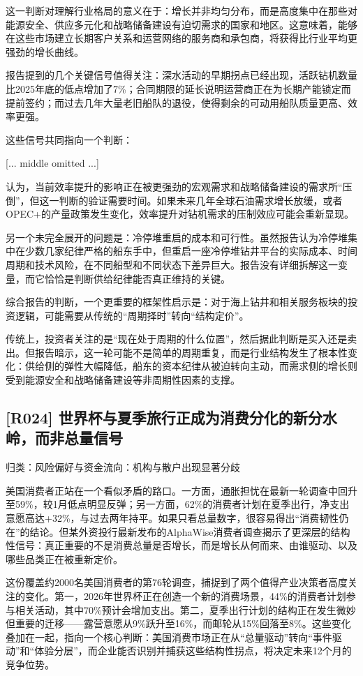 \documentclass[11pt]{ctexart}
\begin{document}
这一判断对理解行业格局的意义在于：增长并非均匀分布，而是高度集中在那些对能源安全、供应多元化和战略储备建设有迫切需求的国家和地区。这意味着，能够在这些市场建立长期客户关系和运营网络的服务商和承包商，将获得比行业平均更强劲的增长曲线。

报告提到的几个关键信号值得关注：深水活动的早期拐点已经出现，活跃钻机数量比2025年底的低点增加了7\%；合同期限的延长说明运营商正在为长期产能锁定而提前签约；而过去几年大量老旧船队的退役，使得剩余的可动用船队质量更高、效率更强。

这些信号共同指向一个判断：

[... middle omitted ...]

认为，当前效率提升的影响正在被更强劲的宏观需求和战略储备建设的需求所“压倒”，但这一判断的验证需要时间。如果未来几年全球石油需求增长放缓，或者OPEC+的产量政策发生变化，效率提升对钻机需求的压制效应可能会重新显现。

另一个未完全展开的问题是：冷停堆重启的成本和可行性。虽然报告认为冷停堆集中在少数几家纪律严格的船东手中，但重启一座冷停堆钻井平台的实际成本、时间周期和技术风险，在不同船型和不同状态下差异巨大。报告没有详细拆解这一变量，而它恰恰是判断供给纪律能否真正维持的关键。

综合报告的判断，一个更重要的框架性启示是：对于海上钻井和相关服务板块的投资逻辑，可能需要从传统的“周期择时”转向“结构定价”。

传统上，投资者关注的是“现在处于周期的什么位置”，然后据此判断是买入还是卖出。但报告暗示，这一轮可能不是简单的周期重复，而是行业结构发生了根本性变化：供给侧的弹性大幅降低，船东的资本纪律从被迫转向主动，而需求侧的增长则受到能源安全和战略储备建设等非周期性因素的支撑。

\subsection{[R024] 世界杯与夏季旅行正成为消费分化的新分水岭，而非总量信号}
{\small\color{refgray}归类：风险偏好与资金流向：机构与散户出现显著分歧}

美国消费者正站在一个看似矛盾的路口。一方面，通胀担忧在最新一轮调查中回升至59\%，较1月低点明显反弹；另一方面，62\%的消费者计划在夏季出行，净支出意愿高达+32\%，与过去两年持平。如果只看总量数字，很容易得出“消费韧性仍在”的结论。但某外资投行最新发布的AlphaWise消费者调查揭示了更深层的结构性信号：真正重要的不是消费总量是否增长，而是增长从何而来、由谁驱动、以及哪些品类正在被重新定价。

这份覆盖约2000名美国消费者的第76轮调查，捕捉到了两个值得产业决策者高度关注的变化。第一，2026年世界杯正在创造一个新的消费场景，44\%的消费者计划参与相关活动，其中70\%预计会增加支出。第二，夏季出行计划的结构正在发生微妙但重要的迁移——露营意愿从9\%跃升至16\%，而邮轮从15\%回落至8\%。这些变化叠加在一起，指向一个核心判断：美国消费市场正在从“总量驱动”转向“事件驱动”和“体验分层”，而企业能否识别并捕获这些结构性拐点，将决定未来12个月的竞争位势。
\end{document}
